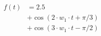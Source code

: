 \begin{center}
\begin{align*}
f(t) &= 2.5 \\
&+ \cos( 2 \cdot w_1 \cdot t +\pi/3 ) \\
&+ \cos( 3 \cdot w_1 \cdot t -\pi/2)
\end{align*}
\end{center}
